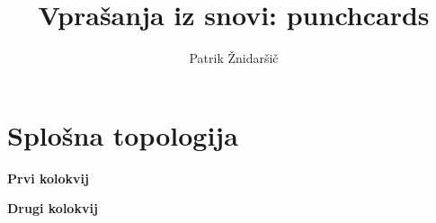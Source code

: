\documentclass{report}
\title{Vprašanja iz snovi: punchcards}
\author{Patrik Žnidaršič}
\date{}
\newcounter{vprasanja}
\newcommand{\podnaslov}[1]{
  {\Huge \bf #1} \\
  \vfill
  \pagebreak
}
\begin{document}
\maketitle

\setcounter{vprasanja}{0}
\chapter{Splošna topologija}
\pagebreak
\podnaslov{Prvi kolokvij}

\pagebreak

\podnaslov{Drugi kolokvij}

\pagebreak
\end{document}
